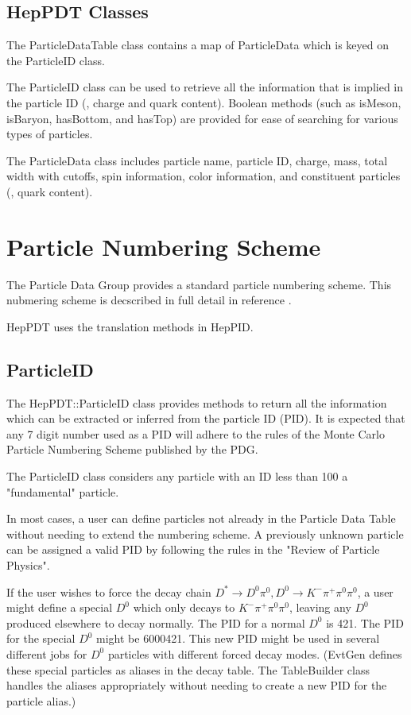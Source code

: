 \subsection{HepPDT Classes}

The ParticleDataTable class contains a map of ParticleData
which is keyed on the ParticleID class.  

The ParticleID
class can be used to retrieve all the information that is implied 
in the particle ID (\eg, charge and quark content).   Boolean methods
(such as isMeson, isBaryon, hasBottom, and hasTop) are provided
for ease of searching for various types of particles.

The ParticleData class includes particle name, particle ID, charge,
mass, total width with cutoffs, spin information, color information, 
and constituent particles (\eg, quark content).  


\section { Particle Numbering Scheme }

The Particle Data Group \cite{pdg} provides a standard particle 
numbering scheme.
This nubmering scheme is decscribed in full detail in
reference \cite{scheme}.

HepPDT uses the translation methods in HepPID.\cite{heppid}

\subsection { ParticleID }

The HepPDT::ParticleID class  
provides methods to return all the information
which can be extracted or inferred from the particle ID (PID).
It is expected that any 7 digit number used as a PID will adhere to the 
rules of the Monte Carlo Particle Numbering Scheme published by the
PDG.\cite{pdg}

The ParticleID class considers any particle with 
an ID less than 100 a "fundamental" particle.

In most cases, a user can define particles not already in the
Particle Data Table without needing to extend the numbering scheme.
A previously unknown particle can be assigned a valid PID by
following the rules in the "Review of Particle Physics".\cite{pdg}

If the user wishes to force the decay chain 
$D^* \rightarrow D^0 \pi^0, D^0 \rightarrow K^- \pi^+ \pi^0 \pi^0$,
a user might define a special $D^0$ which only decays to 
$K^- \pi^+ \pi^0 \pi^0$, leaving any $D^0$ produced elsewhere to decay normally.
The PID for a normal $D^0$ is 421.  The PID for the special $D^0$
might be 6000421.   This new PID might be used in several different jobs
for $D^0$ particles with different forced decay modes.
(EvtGen defines these special particles as aliases in the decay table.
The TableBuilder class handles the aliases appropriately without needing
to create a new PID for the particle alias.)

